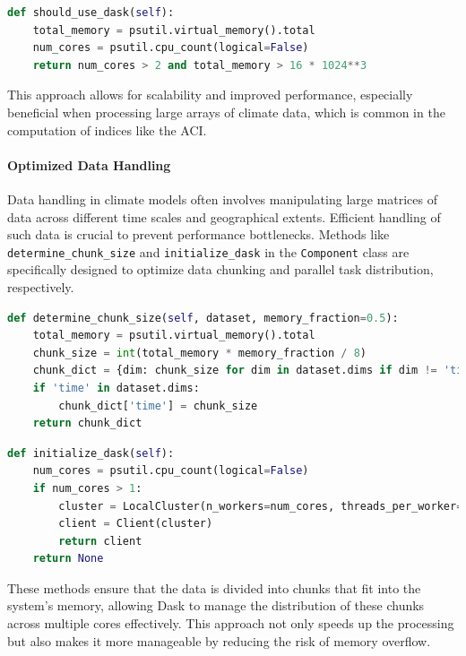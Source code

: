 \documentclass[a4paper,12pt]{article}
\begin{document}
\begin{lstlisting}[language=Python]
def should_use_dask(self):
    total_memory = psutil.virtual_memory().total
    num_cores = psutil.cpu_count(logical=False)
    return num_cores > 2 and total_memory > 16 * 1024**3
\end{lstlisting}

This approach allows for scalability and improved performance, especially beneficial when processing large arrays of climate data, which is common in the computation of indices like the ACI.

\paragraph{Optimized Data Handling}
Data handling in climate models often involves manipulating large matrices of data across different time scales and geographical extents. Efficient handling of such data is crucial to prevent performance bottlenecks. Methods like \texttt{determine\_chunk\_size} and \texttt{initialize\_dask} in the \texttt{Component} class are specifically designed to optimize data chunking and parallel task distribution, respectively.

\begin{lstlisting}[language=Python]
def determine_chunk_size(self, dataset, memory_fraction=0.5):
    total_memory = psutil.virtual_memory().total
    chunk_size = int(total_memory * memory_fraction / 8)
    chunk_dict = {dim: chunk_size for dim in dataset.dims if dim != 'time'}
    if 'time' in dataset.dims:
        chunk_dict['time'] = chunk_size
    return chunk_dict
\end{lstlisting}

\begin{lstlisting}[language=Python]
def initialize_dask(self):
    num_cores = psutil.cpu_count(logical=False)
    if num_cores > 1:
        cluster = LocalCluster(n_workers=num_cores, threads_per_worker=1, dashboard_address=":8787")
        client = Client(cluster)
        return client
    return None
\end{lstlisting}

These methods ensure that the data is divided into chunks that fit into the system's memory, allowing Dask to manage the distribution of these chunks across multiple cores effectively. This approach not only speeds up the processing but also makes it more manageable by reducing the risk of memory overflow.
\end{document}
